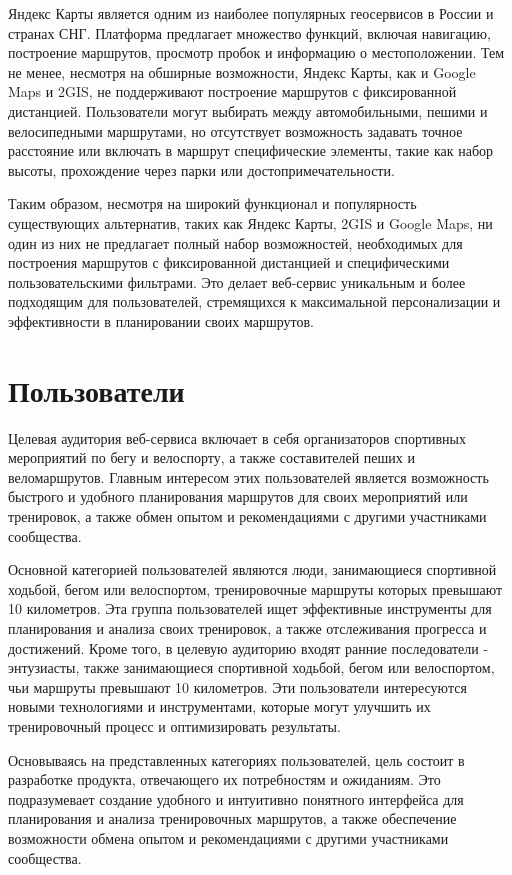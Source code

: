 Яндекс Карты является одним из наиболее популярных геосервисов в России и странах СНГ. Платформа предлагает множество функций, включая навигацию, построение маршрутов, просмотр пробок и информацию о местоположении. Тем не менее, несмотря на обширные возможности, Яндекс Карты, как и Google Maps и 2GIS, не поддерживают построение маршрутов с фиксированной дистанцией. Пользователи могут выбирать между автомобильными, пешими и велосипедными маршрутами, но отсутствует возможность задавать точное расстояние или включать в маршрут специфические элементы, такие как набор высоты, прохождение через парки или достопримечательности.

Таким образом, несмотря на широкий функционал и популярность существующих альтернатив, таких как Яндекс Карты, 2GIS и Google Maps, ни один из них не предлагает полный набор возможностей, необходимых для построения маршрутов с фиксированной дистанцией и специфическими пользовательскими фильтрами. Это делает веб-сервис уникальным и более подходящим для пользователей, стремящихся к максимальной персонализации и эффективности в планировании своих маршрутов.


\section{Пользователи}

Целевая аудитория веб-сервиса включает в себя организаторов спортивных мероприятий по бегу и велоспорту, а также составителей пеших и веломаршрутов. Главным интересом этих пользователей является возможность быстрого и удобного планирования маршрутов для своих мероприятий или тренировок, а также обмен опытом и рекомендациями с другими участниками сообщества.

Основной категорией пользователей являются люди, занимающиеся спортивной ходьбой, бегом или велоспортом, тренировочные маршруты которых превышают 10 километров. Эта группа пользователей ищет эффективные инструменты для планирования и анализа своих тренировок, а также отслеживания прогресса и достижений. Кроме того, в целевую аудиторию входят ранние последователи - энтузиасты, также занимающиеся спортивной ходьбой, бегом или велоспортом, чьи маршруты превышают 10 километров. Эти пользователи интересуются новыми технологиями и инструментами, которые могут улучшить их тренировочный процесс и оптимизировать результаты.

Основываясь на представленных категориях пользователей, цель состоит в разработке продукта, отвечающего их потребностям и ожиданиям. Это подразумевает создание удобного и интуитивно понятного интерфейса для планирования и анализа тренировочных маршрутов, а также обеспечение возможности обмена опытом и рекомендациями с другими участниками сообщества.


